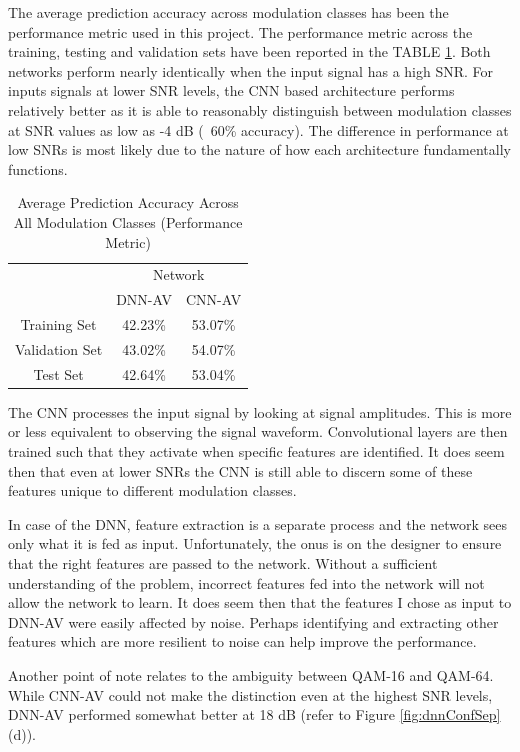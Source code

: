 \documentclass[journal,onecolumn]{IEEEtran}
\begin{document}
The average prediction accuracy across modulation classes has been the performance metric used in this project. The performance metric across the training, testing and validation sets have been reported in the TABLE \ref{tab:discuss}. Both networks perform nearly identically when the input signal has a high SNR. For inputs signals at lower SNR levels, the CNN based architecture performs relatively better as it is able to reasonably distinguish between modulation classes at SNR values as low as -4 dB (~60\% accuracy). The difference in performance at low SNRs is most likely due to the nature of how each architecture fundamentally functions.

\begin{table}[h]
\centering
\caption{Average Prediction Accuracy Across All Modulation Classes (Performance Metric)}
\label{tab:discuss}
\begin{tabular}{ccc}
\hline
\multirow{2}{*}{} & \multicolumn{2}{c}{Network} \\
                  & DNN-AV       & CNN-AV      \\ \hline
Training Set      & 42.23\%      & 53.07\%     \\
Validation Set    & 43.02\%      & 54.07\%     \\
Test Set          & 42.64\%      & 53.04\%     \\ \hline
\end{tabular}
\end{table}

The CNN processes the input signal by looking at signal amplitudes. This is more or less equivalent to observing the signal waveform. Convolutional layers are then trained such that they activate when specific features are identified. It does seem then that even at lower SNRs the CNN is still able to discern some of these features unique to different modulation classes.

In case of the DNN, feature extraction is a separate process and the network sees only what it is fed as input. Unfortunately, the onus is on the designer to ensure that the right features are passed to the network. Without a sufficient understanding of the problem, incorrect features fed into the network will not allow the network to learn. It does seem then that the features I chose as input to DNN-AV were easily affected by noise. Perhaps identifying and extracting other features which are more resilient to noise can help improve the performance.

Another point of note relates to the ambiguity between QAM-16 and QAM-64. While CNN-AV could not make the distinction even at the highest SNR levels, DNN-AV performed somewhat better at 18 dB (refer to Figure \ref{fig:dnnConfSep} (d)).
\end{document}
